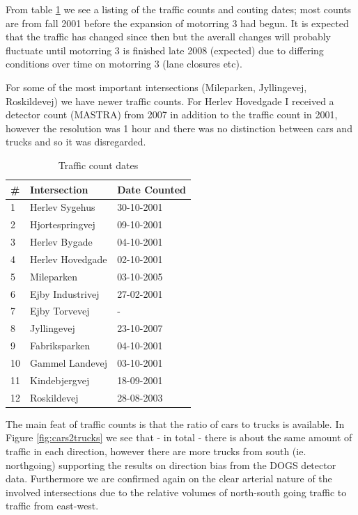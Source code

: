 From table \ref{tab:traffic_counts} we see a listing of the traffic counts and couting dates; most counts are from fall 2001 before the expansion of motorring 3 had begun. It is expected that the traffic has changed since then but the averall changes will probably fluctuate until motorring 3 is finished late 2008 (expected) due to differing conditions over time on motorring 3 (lane closures etc).

For some of the most important intersections (Mileparken, Jyllingevej, Roskildevej) we have newer traffic counts. For Herlev Hovedgade I received a detector count (MASTRA) from 2007 in addition to the traffic count in 2001, however the resolution was 1 hour and there was no distinction between cars and trucks and so it was disregarded.

\begin{table}[!ht]
\centering
\begin{tabular}{l|l|l}
\textbf{\#} & \textbf{Intersection} & \textbf{Date Counted}\\ \hline
1 & Herlev Sygehus & 30-10-2001\\
2 & Hjortespringvej & 09-10-2001\\
3 & Herlev Bygade & 04-10-2001\\
4 & Herlev Hovedgade & 02-10-2001\\
5 & Mileparken & 03-10-2005\\
6 & Ejby Industrivej & 27-02-2001\\
7 & Ejby Torvevej & -\\
8 & Jyllingevej & 23-10-2007\\
9 & Fabriksparken & 04-10-2001\\
10 & Gammel Landevej & 03-10-2001\\
11 & Kindebjergvej & 18-09-2001\\
12 & Roskildevej & 28-08-2003\\
\end{tabular}
\caption{Traffic count dates}
\label{tab:traffic_counts}
\end{table}

The main feat of traffic counts is that the ratio of cars to trucks is available. In Figure \ref{fig:cars2trucks} we see that - in total - there is about the same amount of traffic in each direction, however there are more trucks from south (ie. northgoing) supporting the results on direction bias from the DOGS detector data. Furthermore we are confirmed again on the clear arterial nature of the involved intersections due to the relative volumes of north-south going traffic to traffic from east-west.

